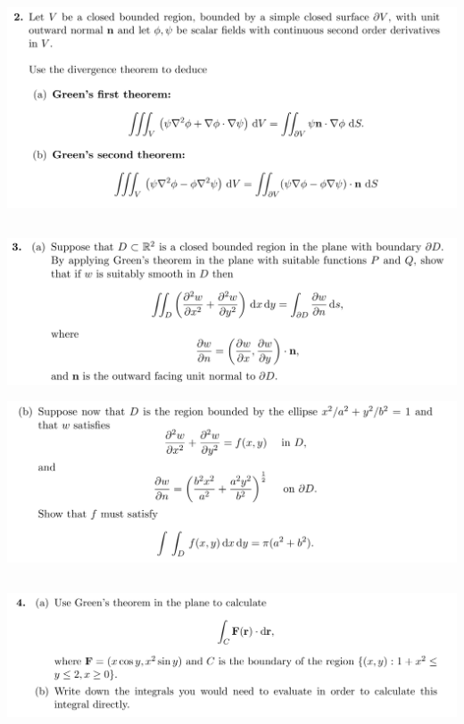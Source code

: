 \subsection{}
\begin{mdframed}
  \includegraphics[width=400pt]{img/oxford-prelims-M5-multivariable-calc-7-2.png}
\end{mdframed}

\subsection{}
\begin{mdframed}
  \includegraphics[width=400pt]{img/oxford-prelims-M5-multivariable-calc-7-3-a.png}
\end{mdframed}

\begin{mdframed}
  \includegraphics[width=400pt]{img/oxford-prelims-M5-multivariable-calc-7-3-b.png}
\end{mdframed}

\subsection{}
\begin{mdframed}
  \includegraphics[width=400pt]{img/oxford-prelims-M5-multivariable-calc-7-4.png}
\end{mdframed}

